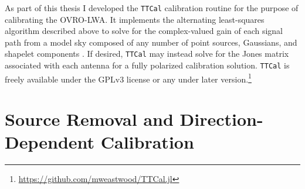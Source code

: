 \begin{bibunit}
As part of this thesis I developed the \texttt{TTCal} calibration routine for the purpose of
calibrating the OVRO-LWA. It implements the alternating least-squares algorithm described above to
solve for the complex-valued gain of each signal path from a model sky composed of any number of
point sources, Gaussians, and shapelet components \citep{2003MNRAS.338...35R}. If desired,
\texttt{TTCal} may instead solve for the Jones matrix associated with each antenna for a fully
polarized calibration solution. \texttt{TTCal} is freely available under the GPLv3 license or any
under later version.\footnote{
    \url{https://github.com/mweastwood/TTCal.jl}
}


\section{Source Removal and Direction-Dependent Calibration}


\end{bibunit}
